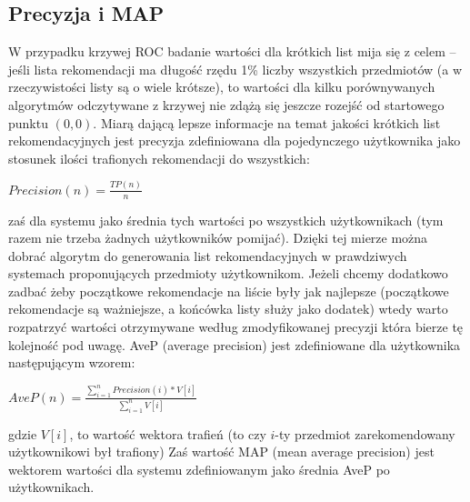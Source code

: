 \documentclass{pracamgr}
\begin{document}
   \subsection{Precyzja i MAP}
    W przypadku krzywej ROC badanie wartości dla krótkich list mija się z celem -- jeśli lista rekomendacji ma długość rzędu 1\% liczby wszystkich przedmiotów
    (a w rzeczywistości listy są o wiele krótsze), to wartości dla kilku porównywanych algorytmów odczytywane
    z krzywej nie zdążą się jeszcze rozejść od startowego punktu $(0,0)$.\newline
    Miarą dającą lepsze informacje na temat jakości krótkich list rekomendacyjnych jest
    precyzja zdefiniowana dla pojedynczego użytkownika jako stosunek ilości trafionych rekomendacji do wszystkich:
    \begin{center}
     $Precision(n)=\frac{TP(n)}{n}$
    \end{center}
    zaś dla systemu jako średnia tych wartości po wszystkich użytkownikach (tym razem nie trzeba żadnych użytkowników pomijać).\newline
    Dzięki tej mierze można dobrać algorytm do generowania list rekomendacyjnych w prawdziwych systemach proponujących przedmioty użytkownikom.
    Jeżeli chcemy dodatkowo zadbać żeby początkowe rekomendacje na liście były jak najlepsze
    (początkowe rekomendacje są ważniejsze, a końcówka listy służy jako dodatek) wtedy warto rozpatrzyć wartości otrzymywane według zmodyfikowanej precyzji
    która bierze tę kolejność pod uwagę.
    AveP (average precision) jest zdefiniowane dla użytkownika następującym wzorem:
    \begin{center}
     $AveP(n)=\frac{\sum\limits_{i=1}^{n}Precision(i)*V[i]}{\sum\limits_{i=1}^{n}V[i]}$
    \end{center} 
    {\scriptsize
     gdzie $V[i]$, to wartość wektora trafień (to czy $i$-ty przedmiot zarekomendowany użytkownikowi był trafiony)
    }\newline
    Zaś wartość MAP (mean average precision) jest wektorem wartości dla systemu zdefiniowanym jako średnia AveP po użytkownikach.
\end{document}

